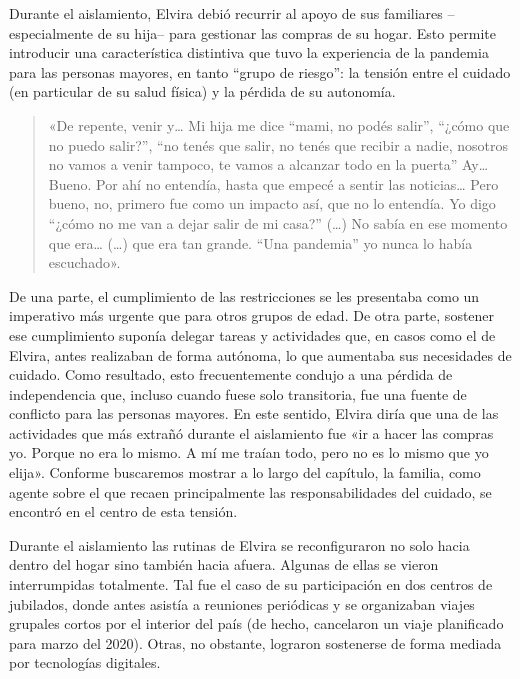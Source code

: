 Durante el aislamiento, Elvira debió recurrir al apoyo de sus familiares --especialmente de su hija-- para gestionar las compras de su hogar. Esto permite introducir una característica distintiva que tuvo la experiencia de la pandemia para las personas mayores, en tanto ``grupo de riesgo'': la tensión entre el cuidado (en particular de su salud física) y la pérdida de su autonomía.

\begin{quote}
«De repente, venir y\ldots{} Mi hija me dice ``mami, no podés salir'', ``¿cómo que no puedo salir?'', ``no tenés que salir, no tenés que recibir a nadie, nosotros no vamos a venir tampoco, te vamos a alcanzar todo en la puerta'' Ay\ldots{} Bueno. Por ahí no entendía, hasta que empecé a sentir las noticias\ldots{} Pero bueno, no, primero fue como un impacto así, que no lo entendía. Yo digo ``¿cómo no me van a dejar salir de mi casa?'' (\ldots) No sabía en ese momento que era\ldots{} (\ldots) que era tan grande. ``Una pandemia'' yo nunca lo había escuchado».
\end{quote}

De una parte, el cumplimiento de las restricciones se les presentaba como un imperativo más urgente que para otros grupos de edad. De otra parte, sostener ese cumplimiento suponía delegar tareas y actividades que, en casos como el de Elvira, antes realizaban de forma autónoma, lo que aumentaba sus necesidades de cuidado. Como resultado, esto frecuentemente condujo a una pérdida de independencia que, incluso cuando fuese solo transitoria, fue una fuente de conflicto para las personas mayores. En este sentido, Elvira diría que una de las actividades que más extrañó durante el aislamiento fue «ir a hacer las compras yo. Porque no era lo mismo. A mí me traían todo, pero no es lo mismo que yo elija». Conforme buscaremos mostrar a lo largo del capítulo, la familia, como agente sobre el que recaen principalmente las responsabilidades del cuidado, se encontró en el centro de esta tensión.

Durante el aislamiento las rutinas de Elvira se reconfiguraron no solo hacia dentro del hogar sino también hacia afuera. Algunas de ellas se vieron interrumpidas totalmente. Tal fue el caso de su participación en dos centros de jubilados, donde antes asistía a reuniones periódicas y se organizaban viajes grupales cortos por el interior del país (de hecho, cancelaron un viaje planificado para marzo del 2020). Otras, no obstante, lograron sostenerse de forma mediada por tecnologías digitales.

